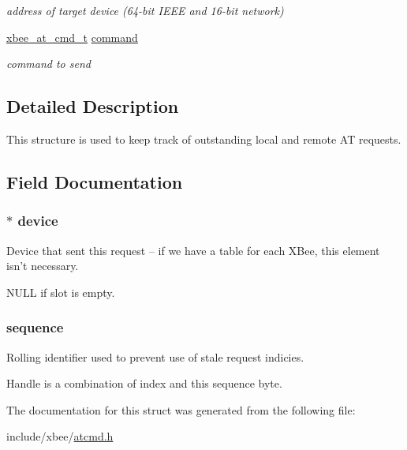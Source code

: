 \begin{DoxyCompactItemize}
\begin{DoxyCompactList}\small\item\em address of target device (64-\/bit I\-E\-E\-E and 16-\/bit network) \end{DoxyCompactList}\item 
\hypertarget{structxbee__cmd__request__t_aa1e66c60bb56acaced6ca2646fd44616}{\hyperlink{unionxbee__at__cmd__t}{xbee\-\_\-at\-\_\-cmd\-\_\-t} \hyperlink{structxbee__cmd__request__t_aa1e66c60bb56acaced6ca2646fd44616}{command}}\label{structxbee__cmd__request__t_aa1e66c60bb56acaced6ca2646fd44616}

\begin{DoxyCompactList}\small\item\em command to send \end{DoxyCompactList}\end{DoxyCompactItemize}


\subsection{Detailed Description}
This structure is used to keep track of outstanding local and remote A\-T requests. 

\subsection{Field Documentation}
\hypertarget{structxbee__cmd__request__t_ac780e07a2b2cd8df18f56240588090c5}{
\subsubsection[{device}]{$\ast$ device}}\label{structxbee__cmd__request__t_ac780e07a2b2cd8df18f56240588090c5}


Device that sent this request -- if we have a table for each X\-Bee, this element isn't necessary. 

N\-U\-L\-L if slot is empty. \hypertarget{structxbee__cmd__request__t_acb5c8866a58116314f6c8eda9dc3544c}{
\subsubsection[{sequence}]{ sequence}}\label{structxbee__cmd__request__t_acb5c8866a58116314f6c8eda9dc3544c}


Rolling identifier used to prevent use of stale request indicies. 

Handle is a combination of index and this sequence byte. 

The documentation for this struct was generated from the following file\-:\begin{DoxyCompactItemize}
\item 
include/xbee/\hyperlink{atcmd_8h}{atcmd.\-h}\end{DoxyCompactItemize}
